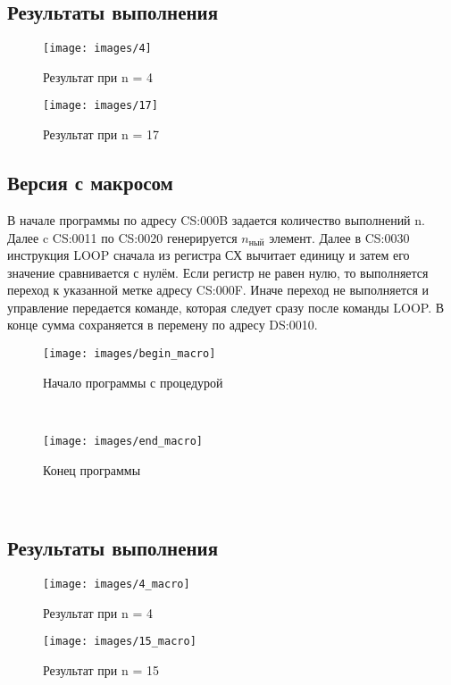\subsection{Результаты выполнения}
\begin{figure}[ht!]
	\centering
	\texttt{[image: images/4]}
	\caption{Результат при n = 4}
	\label{proc:4}
\end{figure}
\begin{figure}[ht!]
	\centering
	\texttt{[image: images/17]}
	\caption{Результат при n = 17}
	\label{proc:5}
\end{figure}
\newpage
\subsection{Версия с макросом}
В начале программы по адресу CS:000B задается количество выполнений n. Далее c CS:0011 по CS:0020 генерируется $n_\text{ный}$ элемент. Далее в CS:0030 инструкция LOOP сначала из регистра СХ вычитает единицу и затем его значение сравнивается с нулём. Если регистр не равен нулю, то выполняется переход к указанной метке адресу CS:000F. Иначе переход не выполняется и управление передается команде, которая следует сразу после команды LOOP. В конце сумма сохраняется в перемену по адресу DS:0010.
\begin{figure}[ht!]
	\centering
	\texttt{[image: images/begin\_macro]}
	\caption{Начало программы с процедурой}
	\label{macro:1}
\end{figure}\\
\begin{figure}[ht!]
	\centering
	\texttt{[image: images/end\_macro]}
	\caption{Конец программы}
	\label{macro:2}
\end{figure}\\

\subsection{Результаты выполнения}
\begin{figure}[ht!]
	\centering
	\texttt{[image: images/4\_macro]}
	\caption{Результат при n = 4}
	\label{proc:4}
\end{figure}
\begin{figure}[ht!]
	\centering
	\texttt{[image: images/15\_macro]}
	\caption{Результат при n = 15}
	\label{proc:5}
\end{figure}
